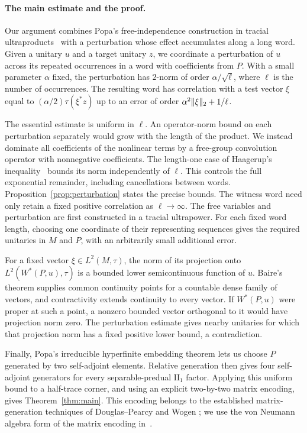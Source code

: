 \paragraph{The main estimate and the proof.}
Our argument combines Popa's free-independence construction in tracial
ultraproducts~\cite{Popa1995,Popa2014} with a perturbation whose effect
accumulates along a long word. Given a unitary $u$ and a target unitary
$z$, we coordinate a perturbation of $u$ across its repeated occurrences
in a word with coefficients from $P$. With a small parameter $\alpha$
fixed, the perturbation has $2$-norm of order $\alpha/\sqrt\ell$,
where $\ell$ is the number of occurrences. The resulting word has
correlation with a test vector $\xi$ equal to
$(\alpha/2)\tau(\xi^*z)$ up to an error of order
$\alpha^2\lVert \xi\rVert_2+1/\ell$.

The essential estimate is uniform in $\ell$. An operator-norm bound
on each perturbation separately would grow with the length of the
product. We instead dominate all coefficients of the nonlinear terms
by a free-group convolution operator with nonnegative coefficients. The length-one case of
Haagerup's inequality~\cite[Lemma~1.4]{Haagerup1979} bounds its norm
independently of $\ell$. This controls the full exponential remainder,
including cancellations between words. Proposition~\ref{prop:perturbation}
states the precise bounds. The witness word need only retain a fixed
positive correlation as $\ell\to\infty$.
The free variables and perturbation are first constructed in a tracial
ultrapower. For each fixed word length, choosing one coordinate of
their representing sequences gives the required unitaries in $M$ and
$P$, with an arbitrarily small additional error.

For a fixed vector $\xi\in L^2(M,\tau)$, the norm of its projection
onto $L^2(W^*(P,u),\tau)$ is a bounded lower semicontinuous function
of $u$. Baire's theorem supplies common continuity points for a
countable dense family of vectors, and contractivity extends continuity
to every vector. If $W^*(P,u)$ were proper at such a point, a nonzero
bounded vector orthogonal to it would have projection norm zero.
The perturbation estimate gives nearby unitaries for which that
projection norm has a fixed positive lower bound, a contradiction.

Finally, Popa's irreducible hyperfinite embedding theorem
\cite{Popa1981,Popa2021Ergodic} lets us choose $P$ generated by two
self-adjoint elements. Relative generation then gives four
self-adjoint generators for every separable-predual $\mathrm{II}_1$
factor. Applying this uniform bound to a half-trace corner, and using
an explicit two-by-two matrix encoding, gives
Theorem~\ref{thm:main}. This encoding belongs to the established
matrix-generation techniques of Douglas--Pearcy and Wogen
\cite{DouglasPearcy1969,Wogen1969}; we use the von Neumann
algebra form of the matrix encoding
in~\cite[Proposition~1.1]{DSSW2008}.

